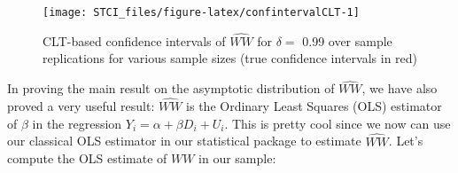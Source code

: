 \documentclass[]{book}
\newenvironment{Shaded}{\begin{snugshade}}{\end{snugshade}}
\newcommand{\KeywordTok}[1]{\textcolor[rgb]{0.13,0.29,0.53}{\textbf{#1}}}
\newcommand{\DataTypeTok}[1]{\textcolor[rgb]{0.13,0.29,0.53}{#1}}
\newcommand{\DecValTok}[1]{\textcolor[rgb]{0.00,0.00,0.81}{#1}}
\newcommand{\StringTok}[1]{\textcolor[rgb]{0.31,0.60,0.02}{#1}}
\newcommand{\OperatorTok}[1]{\textcolor[rgb]{0.81,0.36,0.00}{\textbf{#1}}}
\newcommand{\NormalTok}[1]{#1}
\theoremstyle{definition}
\theoremstyle{definition}
\theoremstyle{definition}
\theoremstyle{remark}
\let\BeginKnitrBlock\begin \let\EndKnitrBlock\end
\begin{document}
\begin{Shaded}
\end{Shaded}

\begin{figure}[htbp]

{\centering \texttt{[image: STCI\_files/figure-latex/confintervalCLT-1]} 

}

\caption{CLT-based confidence intervals of $\hat{WW}$ for $\delta=$ 0.99 over sample replications for various sample sizes (true confidence intervals in red)}\label{fig:confintervalCLT}
\end{figure}

\BeginKnitrBlock{remark}
\iffalse{} {Remark. } \fi{}In proving the main result on the asymptotic
distribution of \(\hat{WW}\), we have also proved a very useful result:
\(\hat{WW}\) is the Ordinary Least Squares (OLS) estimator of \(\beta\)
in the regression \(Y_i=\alpha+\beta D_i + U_i\). This is pretty cool
since we now can use our classical OLS estimator in our statistical
package to estimate \(\hat{WW}\). Let's compute the OLS estimate of
\(WW\) in our sample:
\EndKnitrBlock{remark}
\end{document}
